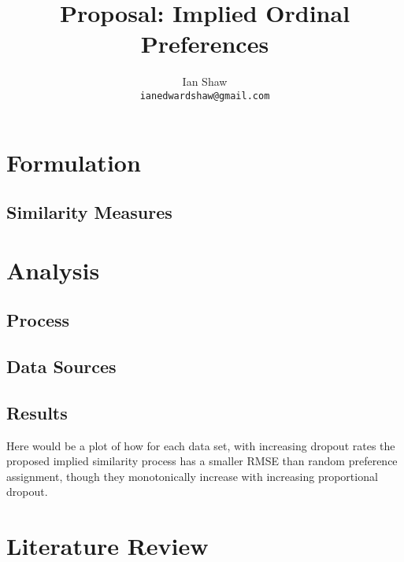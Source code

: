 \documentclass{article}
\title{Proposal: Implied Ordinal Preferences}
\author{Ian Shaw \\ \texttt{ianedwardshaw@gmail.com}}
\begin{document}
\maketitle

\begin{abstract}

\end{abstract}


\newpage

\tableofcontents

\newpage

\section{Formulation}



\subsection{Similarity Measures}



\section{Analysis}

\subsection{Process}



\subsection{Data Sources}



\subsection{Results}

Here would be a plot of how for each data set, with increasing dropout rates the proposed implied similarity process has a smaller RMSE than random preference assignment, though they monotonically increase with increasing proportional dropout.

\section{Literature Review}
\end{document}
